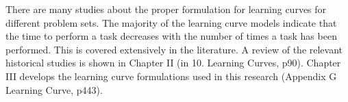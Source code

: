 There are many studies about the proper formulation for learning curves for
different problem sets. The majority of the learning curve models indicate that the time
to perform a task decreases with the number of times a task has been performed. This is
covered extensively in the literature. A review of the relevant historical studies is shown
in Chapter II (in 10. Learning Curves, p90). Chapter III develops the learning curve
formulations used in this research (Appendix G Learning Curve, p443).